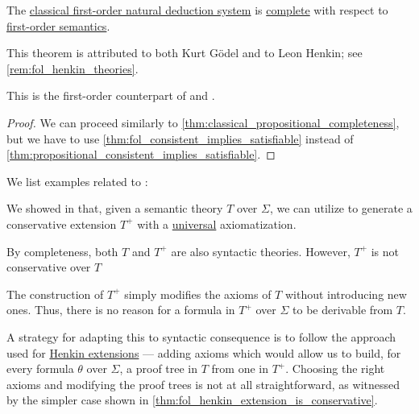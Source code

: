\begin{theorem}\label{thm:fol_completeness}
  The \hyperref[def:fol_natural_deduction]{classical first-order natural deduction system} is \hyperref[def:general_logic/completeness]{complete} with respect to \hyperref[def:fol_semantics]{first-order semantics}.
\end{theorem}
\begin{comments}
  \item This theorem is attributed to both Kurt G\"odel and to Leon Henkin; see \cref{rem:fol_henkin_theories}.

  \item This is the first-order counterpart of  and .
\end{comments}
\begin{proof}
  We can proceed similarly to \cref{thm:classical_propositional_completeness}, but we have to use \cref{thm:fol_consistent_implies_satisfiable} instead of \cref{thm:propositional_consistent_implies_satisfiable}.
\end{proof}

\begin{example}\label{ex:thm:fol_completeness}
  We list examples related to :
  \begin{thmenum}
     We showed in  that, given a semantic theory \( T \) over \( \Sigma \), we can utilize  to generate a conservative extension \( T^+ \) with a \hyperref[def:fol_prenex_normal_form/universal]{universal} axiomatization.

    By completeness, both \( T \) and \( T^+ \) are also syntactic theories. However, \( T^+ \) is not conservative over \( T \)

    The construction of \( T^+ \) simply modifies the axioms of \( T \) without introducing new ones. Thus, there is no reason for a formula in \( T^+ \) over \( \Sigma \) to be derivable from \( T \).

    A strategy for adapting this to syntactic consequence is to follow the approach used for \hyperref[def:fol_henkin_extension]{Henkin extensions} --- adding axioms which would allow us to build, for every formula \( \theta \) over \( \Sigma \), a proof tree in \( T \) from one in \( T^+ \). Choosing the right axioms and modifying the proof trees is not at all straightforward, as witnessed by the simpler case shown in \cref{thm:fol_henkin_extension_is_conservative}.
  \end{thmenum}
\end{example}

